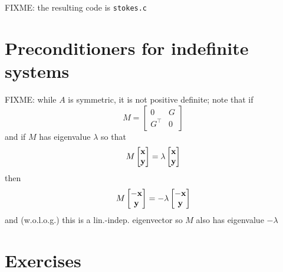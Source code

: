 FIXME: the resulting code is \texttt{stokes.c}


\section{Preconditioners for indefinite systems}

FIXME: while $A$ is symmetric, it is not positive definite; note that if
    $$M = \begin{bmatrix} 0 & G \\ G^\top & 0 \end{bmatrix}$$
and if $M$ has eigenvalue $\lambda$ so that
    $$M \begin{bmatrix} \mathbf{x} \\ \mathbf{y} \end{bmatrix} = \lambda \begin{bmatrix} \mathbf{x} \\ \mathbf{y} \end{bmatrix}$$
then
    $$M \begin{bmatrix} -\mathbf{x} \\ \mathbf{y} \end{bmatrix} = - \lambda \begin{bmatrix} -\mathbf{x} \\ \mathbf{y} \end{bmatrix}$$
and (w.o.l.o.g.) this is a lin.-indep. eigenvector so $M$ also has eigenvalue $-\lambda$


\section{Exercises}

